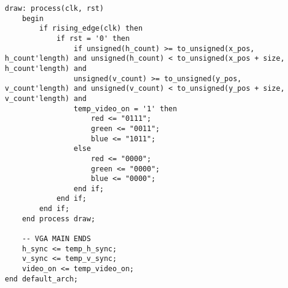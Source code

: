 \documentclass{article}
\begin{document}
\begin{lstlisting}[caption=VGA Entity for Part 3, label=lst:vga-entity-part-3]
	draw: process(clk, rst)
	begin
		if rising_edge(clk) then
			if rst = '0' then
				if unsigned(h_count) >= to_unsigned(x_pos, h_count'length) and unsigned(h_count) < to_unsigned(x_pos + size, h_count'length) and
                unsigned(v_count) >= to_unsigned(y_pos, v_count'length) and unsigned(v_count) < to_unsigned(y_pos + size, v_count'length) and
                temp_video_on = '1' then  
					red <= "0111";
					green <= "0011";
					blue <= "1011";
				else
					red <= "0000";
					green <= "0000";
					blue <= "0000";
				end if;
			end if;
		end if;
	end process draw;

	-- VGA MAIN ENDS
	h_sync <= temp_h_sync;
	v_sync <= temp_v_sync;
	video_on <= temp_video_on;
end default_arch;
\end{lstlisting}
\end{document}
